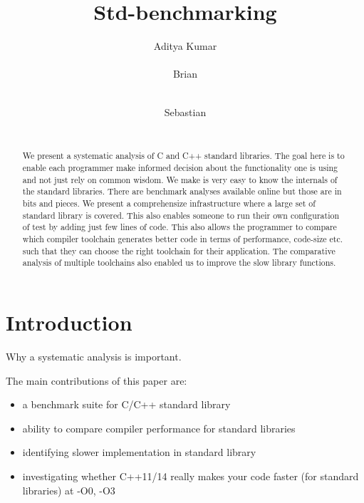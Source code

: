 \documentclass{sig-alternate}
\begin{document}
\def \GCC {GCC}
\def \LLVM {LLVM}

\setlength{\pdfpageheight}{\paperheight}
\setlength{\pdfpagewidth}{\paperwidth}

\title{Std-benchmarking}


\author{
\alignauthor
Aditya Kumar\\
       \\
\alignauthor
Brian\\
       \\
\and
\alignauthor
Sebastian\\
       \\
}

\maketitle
\begin{abstract}
We present a systematic analysis of C and C++ standard libraries. The goal
here is to enable each programmer make informed decision about the functionality
one is using and not just rely on common wisdom. We make is very easy to know
the internals of the standard libraries. There are benchmark analyses available
online but those are in bits and pieces. We present a comprehensize infrastructure
where a large set of standard library is covered. This also enables someone
to run their own configuration of test by adding just few lines of code. This also
allows the programmer to compare which compiler toolchain generates better code
in terms of performance, code-size etc. such that they can choose the right
toolchain for their application. The comparative analysis of multiple toolchains
also enabled us to improve the slow library functions.
\end{abstract}

\section{Introduction}
Why a systematic analysis is important.

The main contributions of this paper are:
\begin{itemize}
\item a benchmark suite for C/C++ standard library
\item ability to compare compiler performance for standard libraries
\item identifying slower implementation in standard library
\item investigating whether C++11/14 really makes your code faster (for
standard libraries) at -O0, -O3
\end{itemize}
\end{document}
